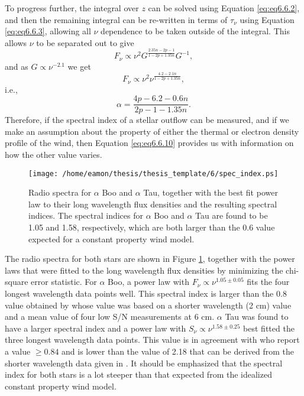 To progress further, the integral over $z$ can be solved using Equation \ref{eq:eq6.6.2}, and then the remaining integral can be re-written in terms of $\tau _{\nu}$ using Equation \ref{eq:eq6.6.3}, allowing all $\nu$ dependence to be taken outside of the integral. This allows $\nu$ to be separated out to give
\begin{equation}
F_{\nu} \propto \nu^2 G^{\frac{2.35n -2p -1}{1-2p +1.35n}} G^{-1},
\label{eq:eq6.6.8}
\end{equation}
and as $G \propto \nu^{-2.1}$ we get
\begin{equation}
F_{\nu} \propto \nu^2 \nu^{\frac{4.2-2.1n}{1-2p +1.35n}},
\label{eq:eq6.6.9}
\end{equation}
i.e.,
\begin{equation}
\alpha = \frac{4p -6.2 -0.6n}{2p-1-1.35n}.
\label{eq:eq6.6.10}
\end{equation}
Therefore, if the spectral index of a stellar outflow can be measured, and if we make an assumption about the property of either the thermal or electron density profile of the wind, then Equation \ref{eq:eq6.6.10} provides us with information on how the other value varies.

\begin{figure}[hbt!]
\centering 
          \texttt{[image: /home/eamon/thesis/thesis\_template/6/spec\_index.ps]}
\caption[Power law fits to the spectra of $\alpha$ Boo and $\alpha$ Tau]{Radio spectra for $\alpha$ Boo and $\alpha$ Tau, together with the best fit power law to their long wavelength flux densities and the resulting spectral indices. The spectral indices for $\alpha$ Boo and $\alpha$ Tau are found to be 1.05 and 1.58, respectively, which are both larger than the 0.6 value expected for a constant property wind model.}
\label{fig6.6.1}
\end{figure}

The radio spectra for both stars are shown in Figure \ref{fig6.6.1}, together with the power laws that were fitted to the long wavelength flux densities by minimizing the chi-square error statistic. For $\alpha$ Boo, a power law with $F_{\nu} \propto \nu ^{1.05 \pm 0.05}$ fits the four longest wavelength data points well. This spectral index is larger than the 0.8 value obtained by \cite{drake_1986} whose value was based on a shorter wavelength (2 cm) value and a mean value of four low S/N measurements at 6 cm. $\alpha$ Tau was found to have a larger spectral index and a power law with $S_{\nu} \propto \nu ^{1.58 \pm 0.25}$ best fitted the three longest wavelength data points. This value is in agreement with \cite{drake_1986} who report a value $\ge 0.84$ and is lower than the value of 2.18 that can be derived from the shorter wavelength data given in \cite{wood_2007}. It should be emphasized that the spectral index for both stars is a lot steeper than that expected from the idealized constant property wind model. 

